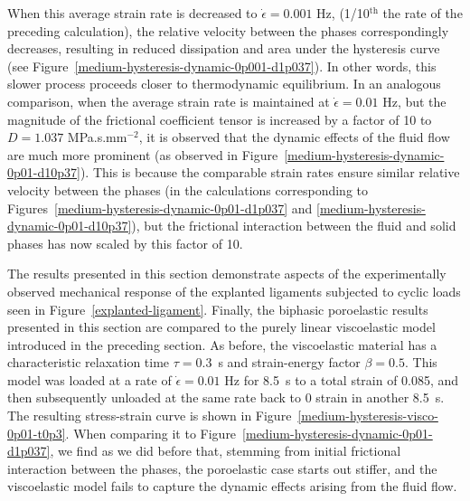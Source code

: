 When this average strain rate is decreased to $\dot{\epsilon} = 0.001$
Hz, (1/10$^\mathrm{th}$ the rate of the preceding calculation), the
relative velocity between the phases correspondingly decreases,
resulting in reduced dissipation and area under the hysteresis curve
(see Figure~\ref{medium-hysteresis-dynamic-0p001-d1p037}). In other
words, this slower process proceeds closer to thermodynamic
equilibrium. In an analogous comparison, when the average strain rate
is maintained at $\dot{\epsilon} = 0.01$ Hz, but the magnitude of the
frictional coefficient tensor is increased by a factor of 10 to
$D=1.037$ MPa.s.mm$^{-2}$, it is observed that the dynamic effects of
the fluid flow are much more prominent (as observed in
Figure~\ref{medium-hysteresis-dynamic-0p01-d10p37}). This is because
the comparable strain rates ensure similar relative velocity between
the phases (in the calculations corresponding to
Figures~\ref{medium-hysteresis-dynamic-0p01-d1p037} and
\ref{medium-hysteresis-dynamic-0p01-d10p37}), but the frictional
interaction between the fluid and solid phases has now scaled by this
factor of 10.

The results presented in this section demonstrate aspects of the
experimentally observed mechanical response of the explanted ligaments
subjected to cyclic loads seen in
Figure~\ref{explanted-ligament}. Finally, the biphasic poroelastic
results presented in this section are compared to the purely linear
viscoelastic model introduced in the preceding section. As before, the
viscoelastic material has a characteristic relaxation time
$\tau=0.3$~s and strain-energy factor $\beta=0.5$. This model was
loaded at a rate of $\dot{\epsilon}=0.01$ Hz for 8.5~s to a total
strain of 0.085, and then subsequently unloaded at the same rate back
to 0 strain in another 8.5~s. The resulting stress-strain curve is
shown in Figure~\ref{medium-hysteresis-visco-0p01-t0p3}. When
comparing it to Figure~\ref{medium-hysteresis-dynamic-0p01-d1p037}, we
find as we did before that, stemming from initial frictional
interaction between the phases, the poroelastic case starts out stiffer,
and the viscoelastic model fails to capture the dynamic effects
arising from the fluid flow.


